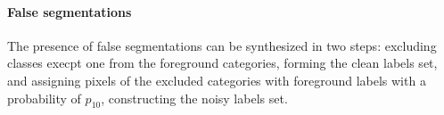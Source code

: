 \paragraph{False segmentations}
The presence of false segmentations can be synthesized in two steps: excluding classes execpt one from the foreground categories, forming the clean labels set, and assigning pixels of the excluded categories with foreground labels with a probability of $p_{10}$, constructing the noisy labels set.
